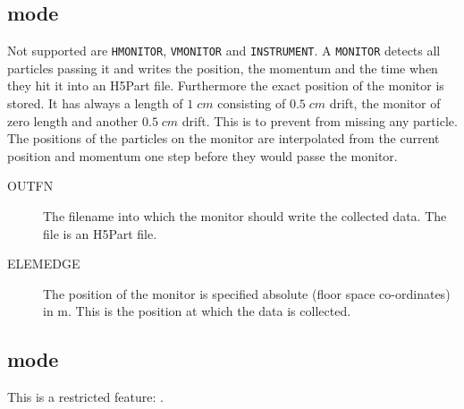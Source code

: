 \subsection{\opalt mode}
Not supported are \texttt{HMONITOR}, \texttt{VMONITOR} and \texttt{INSTRUMENT}. A \texttt{MONITOR} detects all particles passing it and writes the position, the momentum and the time when they hit it into an H5Part file. Furthermore the exact position of the monitor is stored. It has always a length of $1\; cm$ consisting of $0.5\;cm$ drift, the monitor of zero length and another $0.5\;cm$ drift. This is to prevent \opalt from missing any particle. The positions of the particles on the monitor are interpolated from the current position and momentum one step before they would passe the monitor.
\begin{description}
\item[OUTFN]
  The filename into which the monitor should write the collected data. The file is an H5Part file.
\item[ELEMEDGE]
  The position of the monitor is specified absolute (floor space co-ordinates) in m. This is the position at which the data is collected.
\end{description}

\subsection{\opalcycl mode}

This is a restricted feature:  \noopalcycl .



